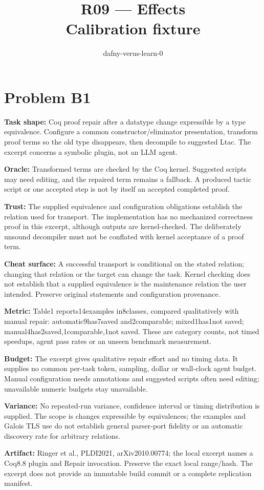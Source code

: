 \documentclass[11pt]{article}
\title{R09 --- Effects \\ \large Calibration fixture}
\author{dafny-verus-learn-0}
\date{}
\begin{document}
\maketitle
\section*{Problem B1}\label{ans:B1}
\begin{answer}
\textbf{Task shape:} Coq proof repair after a datatype change expressible by a type equivalence. Configure a common constructor/eliminator presentation, transform proof terms so the old type disappears, then decompile to suggested Ltac. The excerpt concerns a symbolic plugin, not an LLM agent.

\textbf{Oracle:} Transformed terms are checked by the Coq kernel. Suggested scripts may need editing, and the repaired term remains a fallback. A produced tactic script or one accepted step is not by itself an accepted completed proof.

\textbf{Trust:} The supplied equivalence and configuration obligations establish the relation used for transport. The implementation has no mechanized correctness proof in this excerpt, although outputs are kernel-checked. The deliberately unsound decompiler must not be conflated with kernel acceptance of a proof term.

\textbf{Cheat surface:} A successful transport is conditional on the stated relation; changing that relation or the target can change the task. Kernel checking does not establish that a supplied equivalence is the maintenance relation the user intended. Preserve original statements and configuration provenance.

\textbf{Metric:} Table1 reports14examples in8classes, compared qualitatively with manual repair: automatic9has7saved and2comparable; mixed1has1not saved; manual4has2saved,1comparable,1not saved. These are category counts, not timed speedups, agent pass rates or an unseen benchmark measurement.

\textbf{Budget:} The excerpt gives qualitative repair effort and no timing data. It supplies no common per-task token, sampling, dollar or wall-clock agent budget. Manual configuration needs annotations and suggested scripts often need editing; unavailable numeric budgets stay unavailable.

\textbf{Variance:} No repeated-run variance, confidence interval or timing distribution is supplied. The scope is changes expressible by equivalences; the examples and Galois TLS use do not establish general parser-port fidelity or an automatic discovery rate for arbitrary relations.

\textbf{Artifact:} Ringer et al., PLDI2021, arXiv2010.00774; the local excerpt names a Coq8.8 plugin and Repair invocation. Preserve the exact local range/hash. The excerpt does not provide an immutable build commit or a complete replication manifest.
\end{answer}
\end{document}
